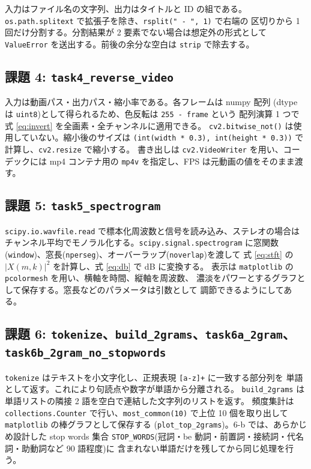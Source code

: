 入力はファイル名の文字列、出力はタイトルと ID の組である。
{\tt os.path.splitext} で拡張子を除き、{\tt rsplit(" - ", 1)} で右端の
区切りから 1 回だけ分割する。分割結果が 2 要素でない場合は想定外の形式として
{\tt ValueError} を送出する。前後の余分な空白は {\tt strip} で除去する。

\subsection{課題 4: {\tt task4\_reverse\_video}}

入力は動画パス・出力パス・縮小率である。各フレームは numpy 配列
(dtype は {\tt uint8})として得られるため、色反転は {\tt 255 - frame} という
配列演算 1 つで式 \ref{eq:invert} を全画素・全チャンネルに適用できる。
{\tt cv2.bitwise\_not()} は使用していない。縮小後のサイズは
{\tt (int(width * 0.3), int(height * 0.3))} で計算し、{\tt cv2.resize} で縮小する。
書き出しは {\tt cv2.VideoWriter} を用い、コーデックには mp4 コンテナ用の
{\tt mp4v} を指定し、FPS は元動画の値をそのまま渡す。

\subsection{課題 5: {\tt task5\_spectrogram}}

{\tt scipy.io.wavfile.read} で標本化周波数と信号を読み込み、ステレオの場合は
チャンネル平均でモノラル化する。{\tt scipy.signal.spectrogram} に窓関数
({\tt window})、窓長({\tt nperseg})、オーバーラップ({\tt noverlap})を渡して
式 \ref{eq:stft} の $|X(m,k)|^2$ を計算し、式 \ref{eq:db} で dB に変換する。
表示は {\tt matplotlib} の {\tt pcolormesh} を用い、横軸を時間、縦軸を周波数、
濃淡をパワーとするグラフとして保存する。窓長などのパラメータは引数として
調節できるようにしてある。

\subsection{課題 6: {\tt tokenize}、{\tt build\_2grams}、{\tt task6a\_2gram}、{\tt task6b\_2gram\_no\_stopwords}}

{\tt tokenize} はテキストを小文字化し、正規表現 {\tt [a-z]+} に一致する部分列を
単語として返す。これにより句読点や数字が単語から分離される。
{\tt build\_2grams} は単語リストの隣接 2 語を空白で連結した文字列のリストを返す。
頻度集計は {\tt collections.Counter} で行い、{\tt most\_common(10)} で上位
10 個を取り出して {\tt matplotlib} の棒グラフとして保存する
({\tt plot\_top\_2grams})。6-b では、あらかじめ設計した stop words 集合
{\tt STOP\_WORDS}(冠詞・be 動詞・前置詞・接続詞・代名詞・助動詞など 90 語程度)に
含まれない単語だけを残してから同じ処理を行う。

